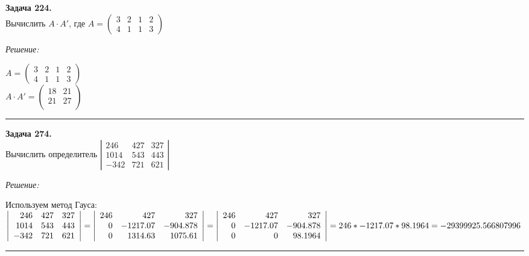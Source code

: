 \documentclass[a4paper, 12pt]{article}
\newenvironment{problem}[2][Задача]
    { \begin{mdframed}[backgroundcolor=gray!10] \textbf{#1 #2.} \\}
    {  \end{mdframed}}
\newenvironment{solution}
    {\textit{Решение: }}
    {\noindent\rule{7in}{1.5pt}}
\begin{document}
\begin{problem}{224}
Вычислить $A\cdot A'$, где $A=\left( \begin{array}{cccc}3 & 2 & 1& 2\\4 & 1 & 1 & 3 \end{array} \right)$
\end{problem}
\begin{solution}

$A=\left( \begin{array}{cccc}3 & 2 & 1& 2\\4 & 1 & 1 & 3 \end{array} \right)$ \\
$
A\cdot A'
=
\left(
\begin{array}{rr}
18 & 21 \\
21 & 27 \\
\end{array}
\right)
$

\end{solution} 

\begin{problem}{274}
Вычислить определитель $\left| \begin{array}{rrr}246 & 427 & 327 \\ 1014 & 543 & 443 \\ -342 & 721 & 621 \end{array} \right|$
\end{problem}
\begin{solution}

Используем метод Гауса: \\
$
\left|
\begin{array}{rrr}
246 & 427 & 327 \\
1014 & 543 & 443 \\
-342 & 721 & 621
\end{array}
\right|
=
\left|
\begin{array}{rrr}
246 & 427 & 327 \\
0 & -1217.07 & -904.878 \\
0 & 1314.63 & 1075.61
\end{array}
\right|
=
\left|
\begin{array}{rrr}
246 & 427 & 327 \\
0 & -1217.07 & -904.878 \\
0 & 0 & 98.1964
\end{array}
\right|
= \\
\\
246 * -1217.07 * 98.1964 = -29399925.566807996
$

\end{solution} 
\end{document}
